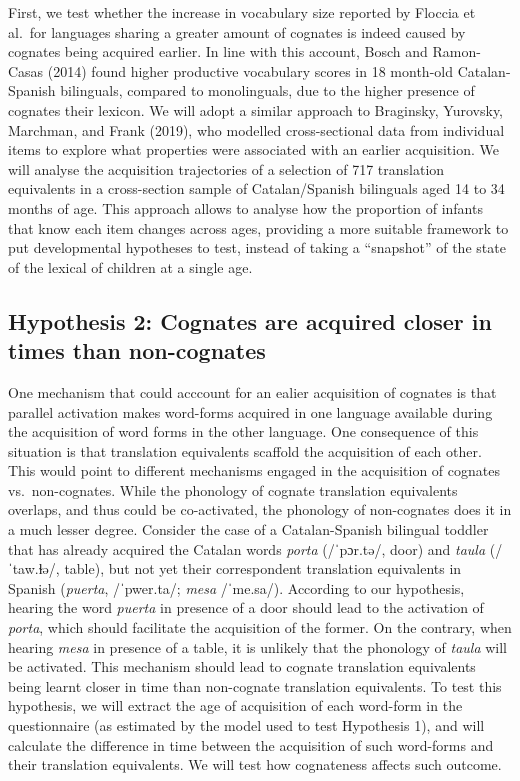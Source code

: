 \documentclass[
  english,
  man,man,floatsintext]{apa6}
\begin{document}
First, we test whether the increase in vocabulary size reported by Floccia et al.~for languages sharing a greater amount of cognates is indeed caused by cognates being acquired earlier. In line with this account, Bosch and Ramon-Casas (2014) found higher productive vocabulary scores in 18 month-old Catalan-Spanish bilinguals, compared to monolinguals, due to the higher presence of cognates their lexicon. We will adopt a similar approach to Braginsky, Yurovsky, Marchman, and Frank (2019), who modelled cross-sectional data from individual items to explore what properties were associated with an earlier acquisition. We will analyse the acquisition trajectories of a selection of 717 translation equivalents in a cross-section sample of Catalan/Spanish bilinguals aged 14 to 34 months of age. This approach allows to analyse how the proportion of infants that know each item changes across ages, providing a more suitable framework to put developmental hypotheses to test, instead of taking a \enquote{snapshot} of the state of the lexical of children at a single age.

\hypertarget{hypothesis-2-cognates-are-acquired-closer-in-times-than-non-cognates}{%
\subsection{Hypothesis 2: Cognates are acquired closer in times than non-cognates}\label{hypothesis-2-cognates-are-acquired-closer-in-times-than-non-cognates}}

One mechanism that could acccount for an ealier acquisition of cognates is that parallel activation makes word-forms acquired in one language available during the acquisition of word forms in the other language. One consequence of this situation is that translation equivalents scaffold the acquisition of each other. This would point to different mechanisms engaged in the acquisition of cognates vs.~non-cognates. While the phonology of cognate translation equivalents overlaps, and thus could be co-activated, the phonology of non-cognates does it in a much lesser degree. Consider the case of a Catalan-Spanish bilingual toddler that has already acquired the Catalan words \emph{porta} (/ˈpɔr.tə/, door) and \emph{taula} (/ˈtaw.ɫə/, table), but not yet their correspondent translation equivalents in Spanish (\emph{puerta}, /ˈpwer.ta/; \emph{mesa} /ˈme.sa/). According to our hypothesis, hearing the word \emph{puerta} in presence of a door should lead to the activation of \emph{porta}, which should facilitate the acquisition of the former. On the contrary, when hearing \emph{mesa} in presence of a table, it is unlikely that the phonology of \emph{taula} will be activated. This mechanism should lead to cognate translation equivalents being learnt closer in time than non-cognate translation equivalents. To test this hypothesis, we will extract the age of acquisition of each word-form in the questionnaire (as estimated by the model used to test Hypothesis 1), and will calculate the difference in time between the acquisition of such word-forms and their translation equivalents. We will test how cognateness affects such outcome.
\end{document}
